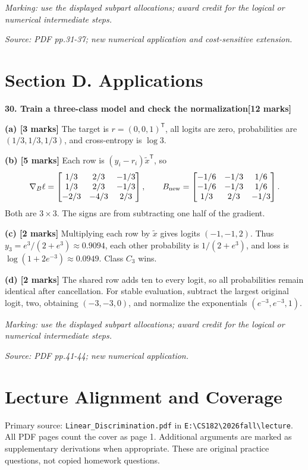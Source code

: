 \documentclass[11pt,a4paper]{article}
\begin{document}
\textit{Marking: use the displayed subpart allocations; award credit for the logical or numerical intermediate steps.}\par
{\footnotesize\textit{Source: PDF pp.31-37; new numerical application and cost-sensitive extension.}}
\newpage\section*{Section D. Applications}
\textbf{30. Train a three-class model and check the normalization}\hfill\textbf{[12 marks]}\par\medskip
\textbf{(a) [3 marks]} The target is \(r=(0,0,1)^{\mathsf T}\), all logits are zero, probabilities are \((1/3,1/3,1/3)\), and cross-entropy is \(\log3\).

\textbf{(b) [5 marks]} Each row is \((y_i-r_i)\widetilde x^{\mathsf T}\), so \[\nabla_B\ell=\begin{bmatrix}1/3&2/3&-1/3\\1/3&2/3&-1/3\\-2/3&-4/3&2/3\end{bmatrix},\qquad B_{\rm new}=\begin{bmatrix}-1/6&-1/3&1/6\\-1/6&-1/3&1/6\\1/3&2/3&-1/3\end{bmatrix}.\] Both are \(3\times3\). The signs are from subtracting one half of the gradient.

\textbf{(c) [2 marks]} Multiplying each row by \(\widetilde x\) gives logits \((-1,-1,2)\). Thus \(y_3=e^3/(2+e^3)\approx0.9094\), each other probability is \(1/(2+e^3)\), and loss is \(\log(1+2e^{-3})\approx0.0949\). Class \(C_3\) wins.

\textbf{(d) [2 marks]} The shared row adds ten to every logit, so all probabilities remain identical after cancellation. For stable evaluation, subtract the largest original logit, two, obtaining \((-3,-3,0)\), and normalize the exponentials \((e^{-3},e^{-3},1)\).

\textit{Marking: use the displayed subpart allocations; award credit for the logical or numerical intermediate steps.}\par
{\footnotesize\textit{Source: PDF pp.41-44; new numerical application.}}
\newpage\section*{Lecture Alignment and Coverage}
Primary source: \texttt{Linear\_Discrimination.pdf} in \texttt{E:\textbackslash CS182\textbackslash 2026fall\textbackslash lecture}. All PDF pages count the cover as page 1. Additional arguments are marked as supplementary derivations when appropriate. These are original practice questions, not copied homework questions.
\end{document}
